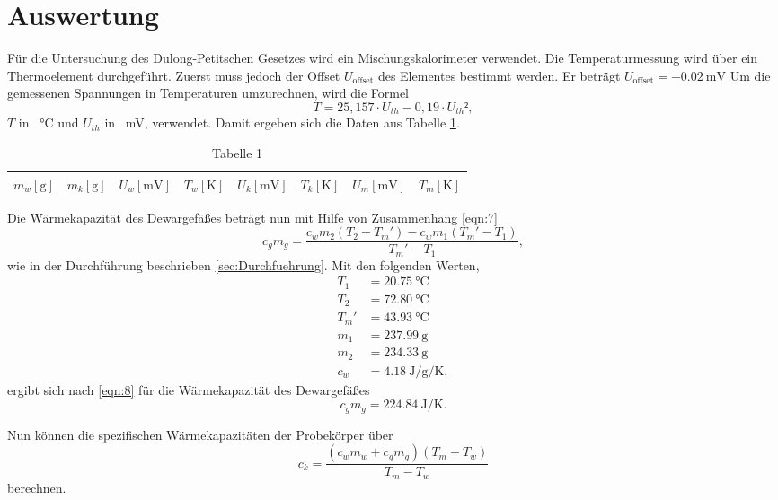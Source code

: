 \section{Auswertung}
\label{sec:Auswertung}

Für die Untersuchung des Dulong-Petitschen Gesetzes wird ein Mischungskalorimeter verwendet.
Die Temperaturmessung wird über ein Thermoelement durchgeführt.
Zuerst muss jedoch der Offset $U_{\text{offset}}$ des Elementes bestimmt werden.
Er beträgt $U_{\text{offset}}= \SI{-0,02}{\milli\volt}$
Um die gemessenen Spannungen in Temperaturen umzurechnen, wird die Formel
\begin{equation}
  T = 25,157 \cdot U_{th} - 0,19 \cdot U_{th}²,
\end{equation}
$T$ in \SI{}{\celsius} und $U_{th}$ in \SI{}{\milli\volt}, verwendet.
Damit ergeben sich die Daten aus Tabelle \ref{tab:1}.
\begin{table}
  \centering
  \caption{Tabelle 1}
  \label{tab:1}
  \begin{tabular}{c c c c c c c c}
    \toprule
    {$m_w [\si{\gram}]$} & {$m_k [\si{\gram}]$} & {$U_w [\si{\milli\volt}]$} & {$T_w [\si{\kelvin}]$} & {$U_k [\si{\milli\volt}]$} & {$T_k [\si{\kelvin}]$} & {$U_m [\si{\milli\volt}]$} & {$T_m [\si{\kelvin}]$} \\
    \midrule
    
    \bottomrule
  \end{tabular}
\end{table}
Die Wärmekapazität des Dewargefäßes beträgt nun mit Hilfe von Zusammenhang \ref{eqn:7}
\begin{equation}
  c_gm_g = \frac{c_wm_2(T_2-T_m')-c_wm_1(T_m'-T_1)}{T_m'-T_1},
  \label{eqn:8}
\end{equation}
wie in der Durchführung beschrieben \ref{sec:Durchfuehrung}.
Mit den folgenden Werten,
\begin{align}
  T_1 &= \SI{20,75}{\celsius} \\
  T_2 &= \SI{72,80}{\celsius} \\
  T_m'&= \SI{43,93}{\celsius} \\
  m_1 &= \SI{237,99}{\gram} \\
  m_2 &= \SI{234,33}{\gram} \\
  c_w &= \SI{4,18}{\joule\per\gram\per\kelvin},
\end{align}
ergibt sich nach \ref{eqn:8} für die Wärmekapazität des Dewargefäßes
\begin{equation}
  c_gm_g = \SI{224,84}{\joule\per\kelvin}.
\end{equation}

Nun können die spezifischen Wärmekapazitäten der Probekörper über
\begin{equation}
  c_k = \frac{(c_wm_w+c_gm_g)(T_m-T_w)}{T_m-T_w}
\end{equation}
berechnen.
